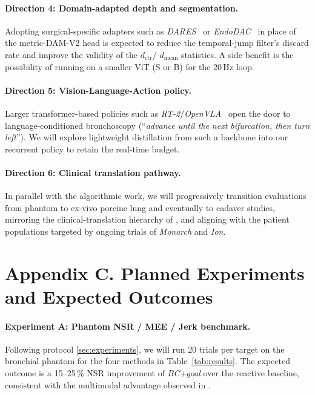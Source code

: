 \documentclass[journal,comsoc]{IEEEtran}
\begin{document}
\paragraph{Direction 4: Domain-adapted depth and segmentation.}
Adopting surgical-specific adapters such as
\textit{DARES}~\cite{dares2024} or \textit{EndoDAC}~\cite{endodac2024}
in place of the metric-DAM-V2 head is expected to reduce the
temporal-jump filter's discard rate and improve the validity of the
$d_\text{ctr}$/ $d_\text{mean}$ statistics. A side benefit is the
possibility of running on a smaller ViT (S or B) for the 20\,Hz loop.

\paragraph{Direction 5: Vision-Language-Action policy.}
Larger transformer-based policies such as
\textit{RT-2}/\textit{OpenVLA}~\cite{kim2024openvla} open the door to
language-conditioned bronchoscopy (``\emph{advance until the next
bifurcation, then turn left}''). We will explore lightweight
distillation from such a backbone into our recurrent policy to
retain the real-time budget.

\paragraph{Direction 6: Clinical translation pathway.}
In parallel with the algorithmic work, we will progressively
transition evaluations from phantom to ex-vivo porcine lung and
eventually to cadaver studies, mirroring the clinical-translation
hierarchy of \cite{longshort2026}, and aligning with the patient
populations targeted by ongoing trials of \emph{Monarch}
\cite{target2025} and \emph{Ion}.

\section*{Appendix C. Planned Experiments and Expected Outcomes}
\label{sec:planned}

\paragraph{Experiment A: Phantom NSR / MEE / Jerk benchmark.}
Following protocol \ref{sec:experiments}, we will run 20 trials per
target on the bronchial phantom for the four methods in
Table~\ref{tab:results}. The expected outcome is a 15--25\,\% NSR
improvement of \emph{BC+goal} over the reactive baseline, consistent
with the multimodal advantage observed in
\cite{pore2024bronchocopilot}.
\end{document}
